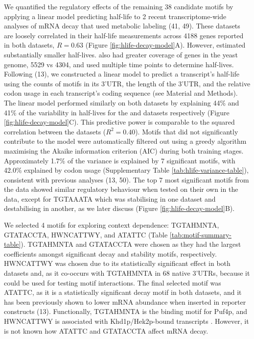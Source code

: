 \documentclass[../main.tex]{subfiles}
\begin{document}
We quantified the regulatory effects of the remaining 38 candidate motifs by applying a linear model predicting half-life to 2 recent transcriptome-wide analyses of mRNA decay that used metabolic labeling (41, 49).
These datasets are loosely correlated in their half-life measurements across 4188 genes reported in both datasets, \(R = 0.63\) (Figure \ref{fig:hlife-decay-model}A). However, \parencite{Chan2018} estimated substantially smaller half-lives.
\parencite{Chan2018} also had greater coverage of genes in the yeast genome, 5529 vs 4304, and used multiple time points to determine half-lives.
Following (13), we constructed a linear model to predict a transcript's half-life using the counts of motifs in its 3'UTR, the length of the 3'UTR, and the relative codon usage in each transcript's coding sequence (see Material and Methods).
The linear model performed similarly on both datasets by explaining 44\% and 41\% of the variability in half-lives for the \parencite{Chan2018} and \parencite{Sun2013} datasets respectively (Figure \ref{fig:hlife-decay-model}C).
This predictive power is comparable to the squared correlation between the datasets (\(R^2 = 0.40\)).
Motifs that did not significantly contribute to the model were automatically filtered out using a greedy algorithm maximising the Akaike information criterion (AIC) during both training stages.
Approximately 1.7\% of the variance is explained by 7 significant motifs, with 42.0\% explained by codon usage (Supplementary Table \ref{tab:hlife-variance-table}), consistent with previous analyses (13, 50).
The top 7 most significant motifs from the \parencite{Chan2018} data showed similar regulatory behaviour when tested on their own in the \parencite{Sun2013} data, except for TGTAAATA which was stabilising in one dataset and destabilising in another, as we later discuss (Figure \ref{fig:hlife-decay-model}B).

We selected 4 motifs for exploring context dependence: TGTAHMNTA, GTATACCTA, HWNCATTWY, and ATATTC (Table \ref{tab:motif-summary-table}).
TGTAHMNTA and GTATACCTA were chosen as they had the largest coefficients amongst significant decay and stability motifs, respectively.
HWNCATTWY was chosen due to its statistically significant effect in both datasets and, as it co-occurs with TGTAHMNTA in 68 native 3'UTRs, because it could be used for testing motif interactions.
The final selected motif was ATATTC, as it is a statistically significant decay motif in both datasets, and it has been previously shown to lower mRNA abundance when inserted in reporter constructs (13).
Functionally, TGTAHMNTA is the binding motif for Puf4p, and HWNCATTWY is associated with Khd1p/Hek2p-bound transcripts \parencite{Hogan2008}.
However, it is not known how ATATTC and GTATACCTA affect mRNA decay.
\end{document}
